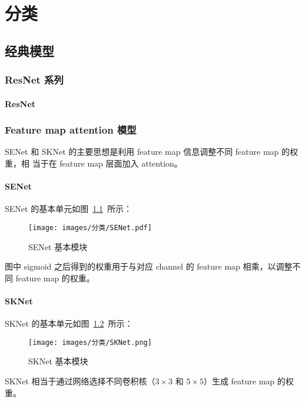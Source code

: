 \part{分类}

\chapter{经典模型}

\section{ResNet 系列}

\subsection{ResNet}
\label{subsec:ResNet}

\section{Feature map attention 模型}
SENet 和 SKNet 的主要思想是利用 feature map 信息调整不同 feature map 的权重，相
当于在 feature map 层面加入 attention。

\subsection{SENet}
\label{subsec:SENet}
SENet 的基本单元如图~\ref{fig:senet}~所示：

\begin{figure}[ht]
  \centering
  \texttt{[image: images/分类/SENet.pdf]}
  \caption{SENet 基本模块}
  \label{fig:senet}
\end{figure}

图中 sigmoid 之后得到的权重用于与对应 channel 的 feature map 相乘，以调整不
同 feature map 的权重。

\subsection{SKNet}
SKNet 的基本单元如图~\ref{fig:sknet}~所示：

\begin{figure}[ht]
  \centering
  \texttt{[image: images/分类/SKNet.png]}
  \caption{SKNet 基本模块}
  \label{fig:sknet}
\end{figure}

SKNet 相当于通过网络选择不同卷积核（$3 \times 3$ 和 $5 \times 5$）生成 feature
map 的权重。

